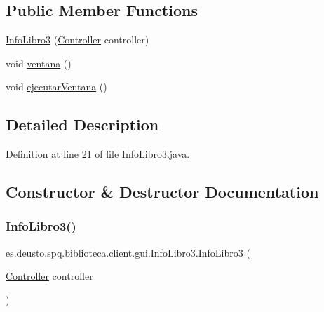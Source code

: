 \subsection*{Public Member Functions}
\begin{DoxyCompactItemize}
\item 
\mbox{\hyperlink{classes_1_1deusto_1_1spq_1_1biblioteca_1_1client_1_1gui_1_1_info_libro3_aab0c4bc9236b13b4398d658d38697b73}{Info\+Libro3}} (\mbox{\hyperlink{classes_1_1deusto_1_1spq_1_1biblioteca_1_1controller_1_1_controller}{Controller}} controller)
\item 
void \mbox{\hyperlink{classes_1_1deusto_1_1spq_1_1biblioteca_1_1client_1_1gui_1_1_info_libro3_a923986e267f32a335e7d675c68926277}{ventana}} ()
\item 
void \mbox{\hyperlink{classes_1_1deusto_1_1spq_1_1biblioteca_1_1client_1_1gui_1_1_info_libro3_a688fb88d1ba1c2b6fb5e48e786dfd0e4}{ejecutar\+Ventana}} ()
\end{DoxyCompactItemize}


\subsection{Detailed Description}


Definition at line 21 of file Info\+Libro3.\+java.



\subsection{Constructor \& Destructor Documentation}
\mbox{\label{classes_1_1deusto_1_1spq_1_1biblioteca_1_1client_1_1gui_1_1_info_libro3_aab0c4bc9236b13b4398d658d38697b73}} 
\subsubsection{\texorpdfstring{Info\+Libro3()}{InfoLibro3()}}
{\footnotesize\ttfamily es.\+deusto.\+spq.\+biblioteca.\+client.\+gui.\+Info\+Libro3.\+Info\+Libro3 (\begin{DoxyParamCaption}\item[{\mbox{\hyperlink{classes_1_1deusto_1_1spq_1_1biblioteca_1_1controller_1_1_controller}{Controller}}}]{controller }\end{DoxyParamCaption})}



